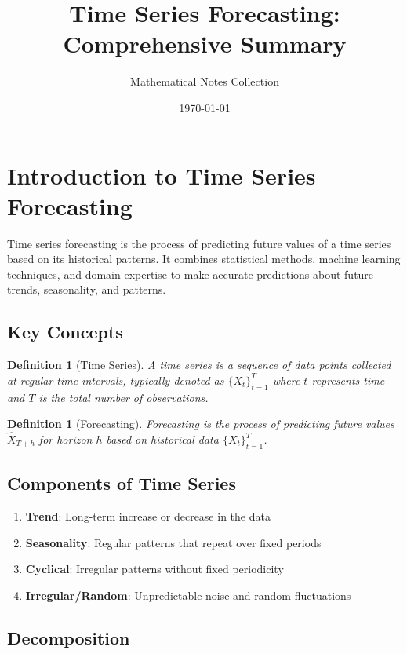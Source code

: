 \documentclass[11pt,a4paper]{article}
\title{Time Series Forecasting: Comprehensive Summary}
\author{Mathematical Notes Collection}
\date{\today}
\newtheorem{definition}[theorem]{Definition}
\begin{document}
\maketitle
\tableofcontents
\newpage

\section{Introduction to Time Series Forecasting}

Time series forecasting is the process of predicting future values of a time series based on its historical patterns. It combines statistical methods, machine learning techniques, and domain expertise to make accurate predictions about future trends, seasonality, and patterns.

\subsection{Key Concepts}

\begin{definition}[Time Series]
A time series is a sequence of data points collected at regular time intervals, typically denoted as $\{X_t\}_{t=1}^T$ where $t$ represents time and $T$ is the total number of observations.
\end{definition}

\begin{definition}[Forecasting]
Forecasting is the process of predicting future values $\hat{X}_{T+h}$ for horizon $h$ based on historical data $\{X_t\}_{t=1}^T$.
\end{definition}

\subsection{Components of Time Series}

\begin{enumerate}
\item \textbf{Trend}: Long-term increase or decrease in the data
\item \textbf{Seasonality}: Regular patterns that repeat over fixed periods
\item \textbf{Cyclical}: Irregular patterns without fixed periodicity
\item \textbf{Irregular/Random}: Unpredictable noise and random fluctuations
\end{enumerate}

\subsection{Decomposition}
\end{document}
